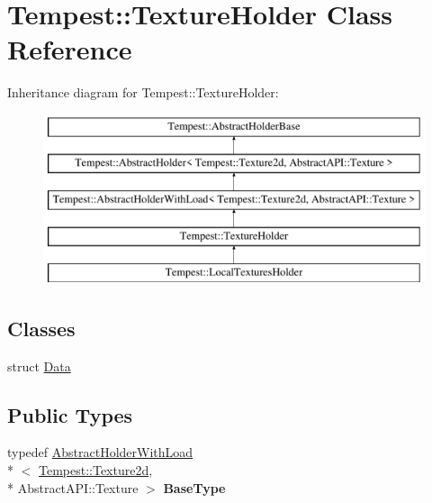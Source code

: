 \hypertarget{class_tempest_1_1_texture_holder}{\section{Tempest\+:\+:Texture\+Holder Class Reference}
\label{class_tempest_1_1_texture_holder}
}
Inheritance diagram for Tempest\+:\+:Texture\+Holder\+:\begin{figure}[H]
\begin{center}
\leavevmode
\includegraphics[height=5.000000cm]{class_tempest_1_1_texture_holder}
\end{center}
\end{figure}
\subsection*{Classes}
\begin{DoxyCompactItemize}
\item 
struct \hyperlink{struct_texture_holder_1_1_data}{Data}
\end{DoxyCompactItemize}
\subsection*{Public Types}
\begin{DoxyCompactItemize}
\item 
\hypertarget{class_tempest_1_1_texture_holder_a0d1037d8a6dfd324a2c438be876dad75}{typedef \hyperlink{class_tempest_1_1_abstract_holder_with_load}{Abstract\+Holder\+With\+Load}\\*
$<$ \hyperlink{class_tempest_1_1_texture2d}{Tempest\+::\+Texture2d}, \\*
Abstract\+A\+P\+I\+::\+Texture $>$ {\bfseries Base\+Type}}\label{class_tempest_1_1_texture_holder_a0d1037d8a6dfd324a2c438be876dad75}

\end{DoxyCompactItemize}

